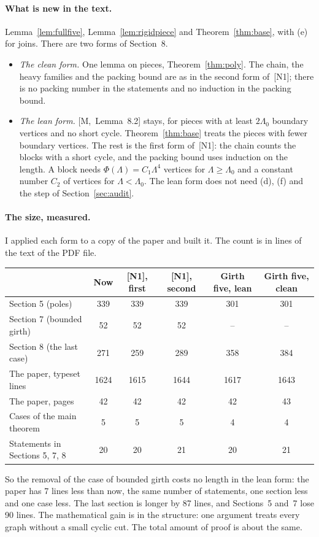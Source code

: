 \documentclass[11pt]{article}
\newcommand{\M}[1]{[M,~#1]}
\begin{document}
\paragraph{What is new in the text.} Lemma~\ref{lem:fullfive}, Lemma~\ref{lem:rigidpiece} and
Theorem~\ref{thm:base}, with (e) for joins. There are two forms of Section~8.
\begin{itemize}[leftmargin=1.2em]
\item \emph{The clean form.} One lemma on pieces, Theorem~\ref{thm:poly}. The chain, the heavy
families and the packing bound are as in the second form of~[N1]; there is no packing number in
the statements and no induction in the packing bound.
\item \emph{The lean form.} \M{Lemma~8.2} stays, for pieces with at least $2\Lambda_0$ boundary
vertices and no short cycle. Theorem~\ref{thm:base} treats the pieces with fewer boundary
vertices. The rest is the first form of~[N1]: the chain counts the blocks with a short cycle,
and the packing bound uses induction on the length. A block needs
$\Phi(\Lambda)=C_1\Lambda^{4}$ vertices for $\Lambda\ge\Lambda_0$ and a constant number $C_2$ of
vertices for $\Lambda<\Lambda_0$. The lean form does not need (d), (f) and the step of
Section~\ref{sec:audit}.
\end{itemize}

\paragraph{The size, measured.} I applied each form to a copy of the paper and built it. The
count is in lines of the text of the PDF file.
\begin{center}
\small
\begin{tabular}{@{}lccccc@{}}
\toprule
 & Now & [N1], first & [N1], second & Girth five, lean & Girth five, clean\\
\midrule
Section 5 (poles) & 339 & 339 & 339 & 301 & 301\\
Section 7 (bounded girth) & 52 & 52 & 52 & -- & --\\
Section 8 (the last case) & 271 & 259 & 289 & 358 & 384\\
The paper, typeset lines & 1624 & 1615 & 1644 & 1617 & 1643\\
The paper, pages & 42 & 42 & 42 & 42 & 43\\
Cases of the main theorem & 5 & 5 & 5 & 4 & 4\\
Statements in Sections 5, 7, 8 & 20 & 20 & 21 & 20 & 21\\
\bottomrule
\end{tabular}
\end{center}
So the removal of the case of bounded girth costs no length in the lean form: the paper has 7
lines less than now, the same number of statements, one section less and one case less. The
last section is longer by 87 lines, and Sections~5 and~7 lose 90 lines. The mathematical gain is
in the structure: one argument treats every graph without a small cyclic cut. The total amount
of proof is about the same.
\end{document}
